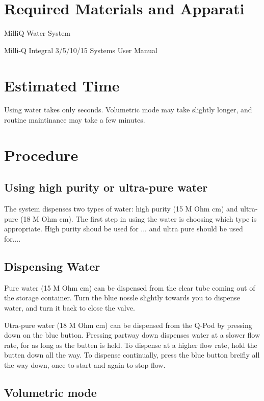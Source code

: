 \documentclass[12pt]{../SOP3_beta}
\begin{document}
\section{Required Materials and Apparati}

\NP MilliQ Water System

\NP Milli-Q Integral 3/5/10/15 Systems User Manual

\section{Estimated Time}

\NP Using water takes only seconds. Volumetric mode may take slightly longer, and routine maintinance may take a few minutes. 

\section{Procedure}

\subsection{Using high purity or ultra-pure water}

\NP The system dispenses two types of water: high purity (15 M Ohm cm) and ultra-pure (18 M Ohm cm). The first step in using the water is choosing which type is appropriate. High purity shoud be used for ... and ultra pure should be used for....

\subsection{Dispensing Water}

\NP Pure water (15 M Ohm cm) can be dispensed from the clear tube coming out of the storage container. Turn the blue nossle slightly towards you to dispense water, and turn it back to close the valve. 

\NP Utra-pure water (18 M Ohm cm) can be dispensed from the Q-Pod by pressing down on the blue button. Pressing partway down dispenses water at a slower flow rate, for as long as the butten is held. To dispense at a higher flow rate, hold the butten down all the way. To dispense continually, press the blue button breifly all the way down, once to start and again to stop flow.  

\subsection{Volumetric mode}
\end{document}
